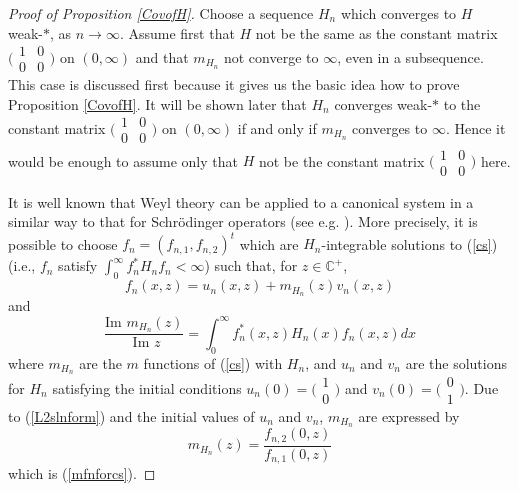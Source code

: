 \documentclass[preprint,12pt]{elsarticle}
\newcommand{\C}{{\mathbb C}}
\begin{document}
\begin{proof}[Proof of Proposition \ref{CovofH}]
Choose a sequence $  H_n $ which converges to $H$ weak-$*$, as $n\to\infty$. Assume first that $H$ not be the same as the constant matrix $\big( \begin{smallmatrix} 1 & 0 \\ 0 & 0 \end{smallmatrix}\big)$ on $(0,\infty)$ and that $m_{H_n}$ not converge to $\infty$, even in a subsequence.  This case is discussed first because it gives us the basic idea how to prove Proposition \ref{CovofH}. It will be shown later that  $H_n$ converges weak-$*$ to  the constant matrix $\big( \begin{smallmatrix} 1 & 0 \\ 0 & 0 \end{smallmatrix}\big)$ on $(0,\infty)$ if and only if $m_{H_n}$ converges to $\infty$. Hence it would be enough to assume only that $H$ not be the constant matrix $\big( \begin{smallmatrix} 1 & 0 \\ 0 & 0 \end{smallmatrix}\big)$ here.

It is well known that Weyl theory can be applied to a canonical system in a similar way to that for Schr\"odinger operators (see e.g.  \cite{Achrt}).  More precisely, it is possible to choose $f_n=( f_{n,1} ,f_{n,2})^t$ which are $H_n$-integrable solutions to (\ref{cs})  (i.e., $f_n$ satisfy $\int_0^{\infty}f_n^*H_nf_n<\infty$) such that, for $z\in\C^+$, 
\begin{equation}
\label{L2slnform}
f_n(x,z)=u_n(x,z)+m_{H_n}(z)v_n(x,z)
\end{equation}
and  
\begin{equation}
\label{ImwithH}
\frac{\textrm{Im }m_{H_n}(z)}{\textrm{ Im }z}=\int_0^{\infty}f^*_n(x,z)H_n(x)f_n(x,z)dx  
\end{equation}
where $m_{H_n}$ are the $m$ functions of (\ref{cs}) with $H_n$, and $u_n$ and $v_n$ are the solutions for $H_n$ satisfying the initial conditions $u_n(0)=\big( \begin{smallmatrix} 1 \\ 0 \end{smallmatrix}\big)$ and $v_n(0)=\big( \begin{smallmatrix} 0 \\ 1 \end{smallmatrix}\big)$.
Due to (\ref{L2slnform}) and the initial values of $u_n$ and $v_n$, $m_{H_n}$ are expressed by 
\begin{equation}
\label{expform}
m_{H_n}(z)=\frac{f_{n,2}(0,z)}{f_{n,1}(0,z)}
\end{equation}
which is (\ref{mfnforcs}). 


\end{proof}
\end{document}
